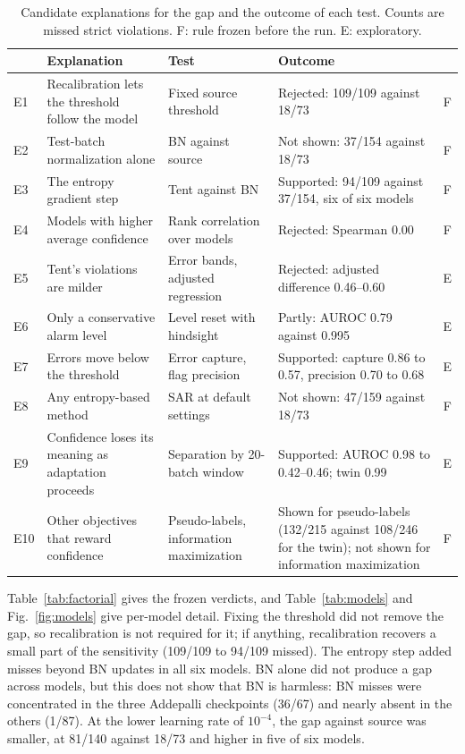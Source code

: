 \documentclass[runningheads]{llncs}
\begin{document}
\begin{table}[t]
\caption{Candidate explanations for the gap and the outcome of each test. Counts are missed strict violations. F: rule frozen before the run. E: exploratory.}
\label{tab:hyp}
\centering\footnotesize\setlength{\tabcolsep}{3pt}
\begin{tabular}{@{}l>{\raggedright\arraybackslash}p{3.3cm}>{\raggedright\arraybackslash}p{2.9cm}>{\raggedright\arraybackslash}p{4.2cm}c@{}}
\toprule
 & Explanation & Test & Outcome & \\
\midrule
E1 & Recalibration lets the threshold follow the model & Fixed source threshold & Rejected: 109/109 against 18/73 & F\\
E2 & Test-batch normalization alone & BN against source & Not shown: 37/154 against 18/73 & F\\
E3 & The entropy gradient step & Tent against BN & Supported: 94/109 against 37/154, six of six models & F\\
E4 & Models with higher average confidence & Rank correlation over models & Rejected: Spearman 0.00 & F\\
E5 & Tent's violations are milder & Error bands, adjusted regression & Rejected: adjusted difference 0.46--0.60 & E\\
E6 & Only a conservative alarm level & Level reset with hindsight & Partly: AUROC 0.79 against 0.995 & E\\
E7 & Errors move below the threshold & Error capture, flag precision & Supported: capture 0.86 to 0.57, precision 0.70 to 0.68 & E\\
E8 & Any entropy-based method & SAR at default settings & Not shown: 47/159 against 18/73 & F\\
E9 & Confidence loses its meaning as adaptation proceeds & Separation by 20-batch window & Supported: AUROC 0.98 to 0.42--0.46; twin 0.99 & E\\
E10 & Other objectives that reward confidence & Pseudo-labels, information maximization & Shown for pseudo-labels (132/215 against 108/246 for the twin); not shown for information maximization & F\\
\bottomrule
\end{tabular}
\end{table}

Table~\ref{tab:factorial} gives the frozen verdicts, and Table~\ref{tab:models} and Fig.~\ref{fig:models} give per-model detail. Fixing the threshold did not remove the gap, so recalibration is not required for it; if anything, recalibration recovers a small part of the sensitivity (109/109 to 94/109 missed). The entropy step added misses beyond BN updates in all six models. BN alone did not produce a gap across models, but this does not show that BN is harmless: BN misses were concentrated in the three Addepalli checkpoints (36/67) and nearly absent in the others (1/87). At the lower learning rate of $10^{-4}$, the gap against source was smaller, at 81/140 against 18/73 and higher in five of six models.
\end{document}
